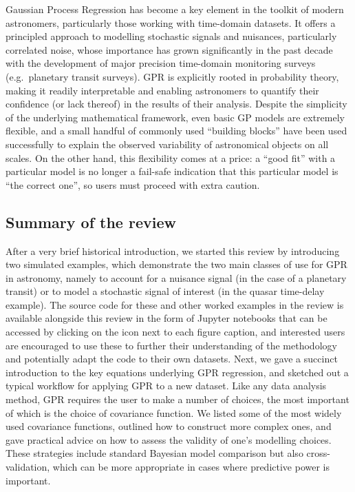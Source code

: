 \documentclass[letterpaper]{ar-1col}
\newcommand{\project}[1]{\textsf{#1}}
\begin{document}
Gaussian Process Regression has become a key element in the toolkit of modern astronomers, particularly those working with time-domain datasets. It offers a principled approach to modelling stochastic signals and nuisances, particularly correlated noise, whose importance has grown significantly in the past decade with the development of major precision time-domain monitoring surveys (e.g.\ planetary transit surveys). GPR is explicitly 
rooted in probability theory, making it readily interpretable and enabling astronomers to quantify their confidence (or lack thereof) in the results of their analysis. Despite the simplicity of the underlying mathematical framework, even basic GP models are extremely flexible, and a small handful of commonly used ``building blocks'' have been used successfully to explain the observed variability of astronomical objects on all scales. On the other hand, this flexibility comes at a price: a ``good fit'' with a particular model is no longer a fail-safe indication that this particular model is ``the correct one'', so users must proceed with extra caution. 

\subsection{Summary of the review}

After a very brief historical introduction, we started this review by introducing two simulated examples, which demonstrate the two main classes of use for GPR in astronomy, namely to account for a nuisance signal (in the case of a planetary transit) or to model a stochastic signal of interest (in the quasar time-delay example). The source code for these and other worked examples in the review is available alongside this review in the form of \project{Jupyter} notebooks that can be accessed by clicking on the icon next to each figure caption, and interested users are encouraged to use these to further their understanding of the methodology and potentially adapt the code to their own datasets. Next, we gave a succinct introduction to the key equations underlying GPR regression, and sketched out a typical workflow for applying GPR to a new dataset. Like any data analysis method, GPR requires the user to make a number of choices, the most important of which is the choice of covariance function. We listed some of the most widely used covariance functions, outlined how to construct more complex ones, and gave practical advice on how to assess the validity of one's modelling choices. These strategies include standard Bayesian model comparison but also cross-validation, which can be more appropriate in cases where predictive power is important. 
\end{document}
